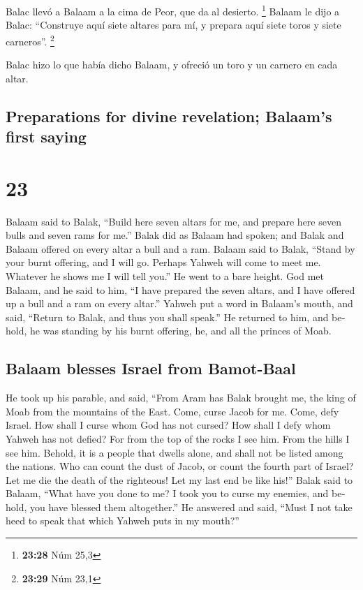 \begin{paracol}{2}
 Balac llevó a Balaam a la cima de Peor, que da al
desierto. \footnote{\textbf{23:28} Núm 25,3}  Balaam le
dijo a Balac: ``Construye aquí siete altares para mí, y prepara aquí
siete toros y siete carneros''. \footnote{\textbf{23:29} Núm 23,1}

 Balac hizo lo que había dicho Balaam, y ofreció un toro
y un carnero en cada altar.

\switchcolumn
\begin{otherlanguage}{english}

\hypertarget{preparations-for-divine-revelation-balaams-first-saying}{%
\subsection{Preparations for divine revelation; Balaam's first
saying}\label{preparations-for-divine-revelation-balaams-first-saying}}

\hypertarget{section-45}{%
\section{23}\label{section-45}}

 Balaam said to Balak, ``Build here seven altars for me,
and prepare here seven bulls and seven rams for me.'' 
Balak did as Balaam had spoken; and Balak and Balaam offered on every
altar a bull and a ram.  Balaam said to Balak, ``Stand by
your burnt offering, and I will go. Perhaps Yahweh will come to meet me.
Whatever he shows me I will tell you.'' He went to a bare height.
 God met Balaam, and he said to him, ``I have prepared the
seven altars, and I have offered up a bull and a ram on every altar.''
 Yahweh put a word in Balaam's mouth, and said, ``Return
to Balak, and thus you shall speak.''  He returned to him,
and behold, he was standing by his burnt offering, he, and all the
princes of Moab.

\hypertarget{balaam-blesses-israel-from-bamot-baal}{%
\subsection{Balaam blesses Israel from
Bamot-Baal}\label{balaam-blesses-israel-from-bamot-baal}}

 He took up his parable, and said, ``From Aram has Balak
brought me, the king of Moab from the mountains of the East. Come, curse
Jacob for me. Come, defy Israel.  How shall I curse whom
God has not cursed? How shall I defy whom Yahweh has not defied?
 For from the top of the rocks I see him. From the hills I
see him. Behold, it is a people that dwells alone, and shall not be
listed among the nations.  Who can count the dust of
Jacob, or count the fourth part of Israel? Let me die the death of the
righteous! Let my last end be like his!''  Balak said to
Balaam, ``What have you done to me? I took you to curse my enemies, and
behold, you have blessed them altogether.''  He answered
and said, ``Must I not take heed to speak that which Yahweh puts in my
mouth?''


\end{otherlanguage}
\end{paracol}
